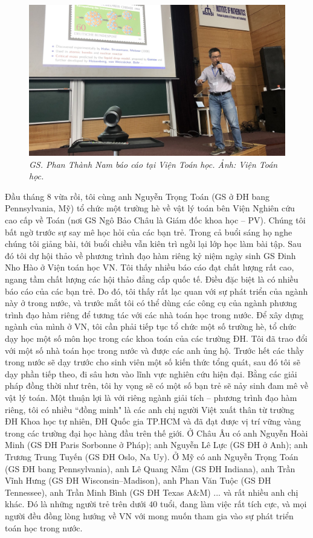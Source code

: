 \begin{multicols}{2}
\begin{figure}[H]
		\captionsetup{labelformat= empty, justification=centering}
		\includegraphics[width=1\linewidth]{4}
		\caption{\small\textit{\color{diendantoanhoc}GS. Phan Thành Nam báo cáo tại Viện Toán học. Ảnh: Viện Toán học.}}
		\vspace*{-10pt}
	\end{figure}
	Đầu tháng $8$ vừa rồi, tôi cùng anh Nguyễn Trọng Toán (GS ở ĐH bang Pennsylvania, Mỹ) tổ chức một trường hè về vật lý toán bên Viện Nghiên cứu cao cấp về Toán (nơi GS Ngô Bảo Châu là Giám đốc khoa học -- PV). Chúng tôi bất ngờ trước sự say mê học hỏi của các bạn trẻ. Trong cả buổi sáng họ nghe chúng tôi giảng bài, tới buổi chiều vẫn kiên trì ngồi lại lớp học làm bài tập. Sau đó tôi dự hội thảo về phương trình đạo hàm riêng kỷ niệm ngày sinh GS Đinh Nho Hào ở Viện toán học VN. Tôi thấy nhiều báo cáo đạt chất lượng rất cao, ngang tầm chất lượng các hội thảo đẳng cấp quốc tế. Điều đặc biệt là có nhiều báo cáo của các bạn trẻ. Do đó, tôi thấy rất lạc quan với sự phát triển của ngành này ở trong nước, và trước mắt tôi có thể dùng các công cụ của ngành phương trình đạo hàm riêng để tương tác với các nhà toán học trong nước. 
	\vskip 0.1cm
	Để xây dựng ngành của mình ở VN, tôi cần phải tiếp tục tổ chức một số trường hè, tổ chức dạy học một số môn học trong các khoa toán của các trường ĐH. Tôi đã trao đổi với một số nhà toán học trong nước và được các anh ủng hộ. Trước hết các thầy trong nước sẽ dạy trước cho sinh viên một số kiến thức tổng quát, sau đó tôi sẽ dạy phần tiếp theo, đi sâu hơn vào lĩnh vực nghiên cứu hiện đại. Bằng các giải pháp đồng thời như trên, tôi hy vọng sẽ có một số bạn trẻ sẽ nảy sinh đam mê về vật lý toán.
	\vskip 0.1cm 
	Một thuận lợi là với riêng ngành giải tích -- phương trình đạo hàm riêng, tôi có nhiều ``đồng minh" là các anh chị người Việt xuất thân từ trường ĐH Khoa học tự nhiên, ĐH Quốc gia TP.HCM và đã đạt được vị trí vững vàng trong các trường đại học hàng đầu trên thế giới. Ở Châu Âu có anh Nguyễn Hoài Minh (GS ĐH Paris Sorbonne ở Pháp); anh Nguyễn Lê Lực (GS ĐH ở Anh); anh Trương Trung Tuyến (GS ĐH Oslo, Na Uy). Ở Mỹ có anh  Nguyễn Trọng Toán (GS ĐH bang Pennsylvania), anh Lê Quang Nẫm (GS ĐH Indiana), anh Trần Vĩnh Hưng (GS ĐH Wisconsin–Madison), anh Phan Văn  Tuộc (GS ĐH Tennessee), anh Trần Minh Bình (GS ĐH Texas A\&M) ... và rất nhiều anh chị khác. Đó là những người trẻ trên dưới $40$ tuổi, đang làm việc rất tích cực, và mọi người đều đồng lòng hướng về VN với mong muốn tham gia vào sự phát triển toán học trong nước.

\end{multicols}
